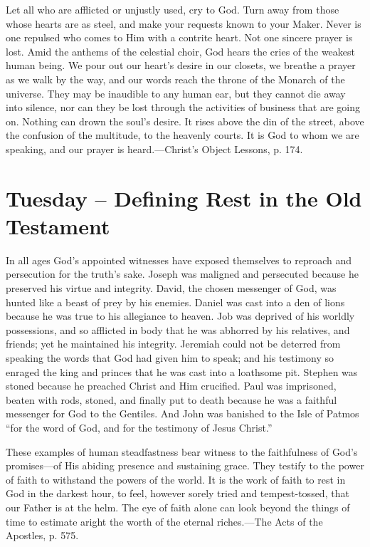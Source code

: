 \documentclass[a4paper, 10pt, twoside, headings=small]{scrartcl}
\begin{document}
\begin{multicols}{2}
Let all who are afflicted or unjustly used, cry to God. Turn away from those whose hearts are as steel, and make your requests known to your Maker. Never is one repulsed who comes to Him with a contrite heart. Not one sincere prayer is lost. Amid the anthems of the celestial choir, God hears the cries of the weakest human being. We pour out our heart’s desire in our closets, we breathe a prayer as we walk by the way, and our words reach the throne of the Monarch of the universe. They may be inaudible to any human ear, but they cannot die away into silence, nor can they be lost through the activities of business that are going on. Nothing can drown the soul’s desire. It rises above the din of the street, above the confusion of the multitude, to the heavenly courts. It is God to whom we are speaking, and our prayer is heard.—Christ’s Object Lessons, p. 174.

\section*{Tuesday – Defining Rest in the Old Testament}

In all ages God’s appointed witnesses have exposed themselves to reproach and persecution for the truth’s sake. Joseph was maligned and persecuted because he preserved his virtue and integrity. David, the chosen messenger of God, was hunted like a beast of prey by his enemies. Daniel was cast into a den of lions because he was true to his allegiance to heaven. Job was deprived of his worldly possessions, and so afflicted in body that he was abhorred by his relatives, and friends; yet he maintained his integrity. Jeremiah could not be deterred from speaking the words that God had given him to speak; and his testimony so enraged the king and princes that he was cast into a loathsome pit. Stephen was stoned because he preached Christ and Him crucified. Paul was imprisoned, beaten with rods, stoned, and finally put to death because he was a faithful messenger for God to the Gentiles. And John was banished to the Isle of Patmos “for the word of God, and for the testimony of Jesus Christ.”

These examples of human steadfastness bear witness to the faithfulness of God’s promises—of His abiding presence and sustaining grace. They testify to the power of faith to withstand the powers of the world. It is the work of faith to rest in God in the darkest hour, to feel, however sorely tried and tempest-tossed, that our Father is at the helm. The eye of faith alone can look beyond the things of time to estimate aright the worth of the eternal riches.—The Acts of the Apostles, p. 575.


\end{multicols}
\end{document}

